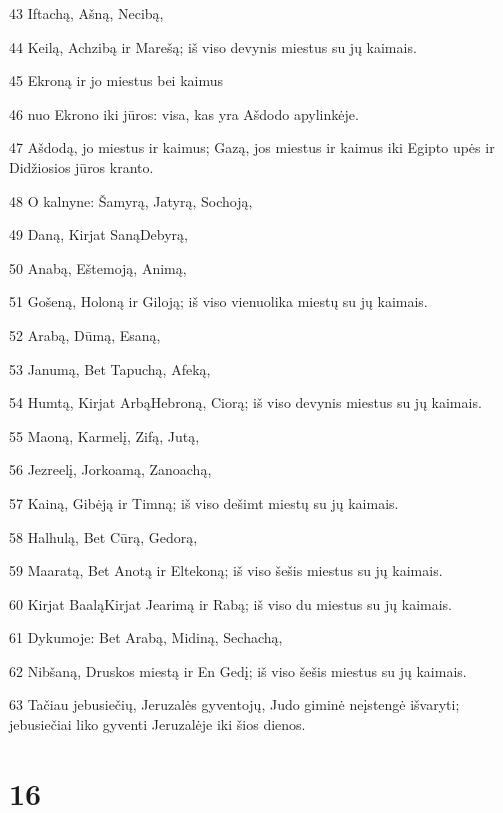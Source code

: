 \par 43 Iftachą, Ašną, Necibą, 
\par 44 Keilą, Achzibą ir Marešą; iš viso devynis miestus su jų kaimais. 
\par 45 Ekroną ir jo miestus bei kaimus 
\par 46 nuo Ekrono iki jūros: visa, kas yra Ašdodo apylinkėje. 
\par 47 Ašdodą, jo miestus ir kaimus; Gazą, jos miestus ir kaimus iki Egipto upės ir Didžiosios jūros kranto. 
\par 48 O kalnyne: Šamyrą, Jatyrą, Sochoją, 
\par 49 Daną, Kirjat Saną­Debyrą, 
\par 50 Anabą, Eštemoją, Animą, 
\par 51 Gošeną, Holoną ir Giloją; iš viso vienuolika miestų su jų kaimais. 
\par 52 Arabą, Dūmą, Esaną, 
\par 53 Janumą, Bet Tapuchą, Afeką, 
\par 54 Humtą, Kirjat Arbą­Hebroną, Ciorą; iš viso devynis miestus su jų kaimais. 
\par 55 Maoną, Karmelį, Zifą, Jutą, 
\par 56 Jezreelį, Jorkoamą, Zanoachą, 
\par 57 Kainą, Gibėją ir Timną; iš viso dešimt miestų su jų kaimais. 
\par 58 Halhulą, Bet Cūrą, Gedorą, 
\par 59 Maaratą, Bet Anotą ir Eltekoną; iš viso šešis miestus su jų kaimais. 
\par 60 Kirjat Baalą­Kirjat Jearimą ir Rabą; iš viso du miestus su jų kaimais. 
\par 61 Dykumoje: Bet Arabą, Midiną, Sechachą, 
\par 62 Nibšaną, Druskos miestą ir En Gedį; iš viso šešis miestus su jų kaimais. 
\par 63 Tačiau jebusiečių, Jeruzalės gyventojų, Judo giminė neįstengė išvaryti; jebusiečiai liko gyventi Jeruzalėje iki šios dienos.



\chapter{16}


